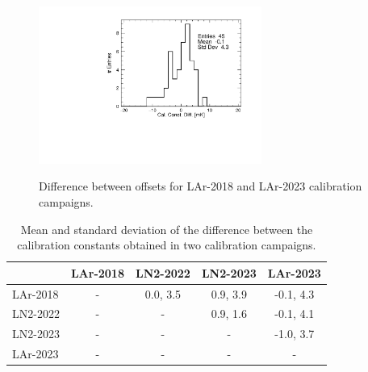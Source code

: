 \begin{figure}[htbp]
\centering
{\includegraphics[width=0.65\textwidth]{images/figure_22.pdf}}
\caption{Difference between offsets for LAr-2018 and LAr-2023 calibration campaigns.}
\label{fig:LAr2018AllDiff}
\end{figure}

\begin{table}[htbp]
\begin{center}
\begin{tabular}{l c c c c}
         & LAr-2018 & LN2-2022 & LN2-2023 & LAr-2023  \\ \hline
LAr-2018 &    -     & 0.0, 3.5& 0.9, 3.9 & -0.1, 4.3 \\
LN2-2022 &    -     &    -     & 0.9, 1.6 &  -0.1, 4.1 \\
LN2-2023 &    -     &    -     &    -     & -1.0, 3.7 \\
LAr-2023 &    -     &    -     &    -     &     -     \\
\end{tabular}
\end{center}
\caption{Mean and standard deviation of the difference between the calibration constants obtained in two calibration campaigns.}
\label{tab:calib_comparison}
\end{table}

